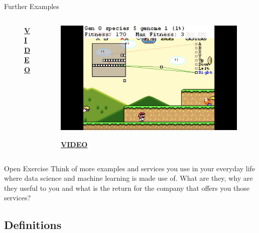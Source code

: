\documentclass[main.tex]{subfiles}
\begin{document}
\begin{frame}{Further Examples}
\begin{columns}
\begin{column}{.3\textwidth}
\begin{figure}
                    \tiny{\textbf{\href{https://www.youtube.com/watch?v=0rc4RqYLtEU}{VIDEO}}}
                \end{figure}
            \end{column}
            \begin{column}{.3\textwidth}
                \begin{figure}
                    \label{fig:marioio}
                    \includegraphics[width=\textwidth, cframe=gray]{figures/external/marioio.png}
                    
                    \tiny{\textbf{\href{https://www.youtube.com/watch?v=qv6UVOQ0F44}{VIDEO}}}
                \end{figure}
            \end{column}
        \end{columns}
    \end{frame}
    
        \begin{frame}{Open Exercise }
        Think of more examples and services you use in your everyday life where data science and machine learning is made use of. What are they, why are they useful to you and what is the return for the company that offers you those services?
    \end{frame}
    
    \subsection{Definitions}
    
\end{document}
